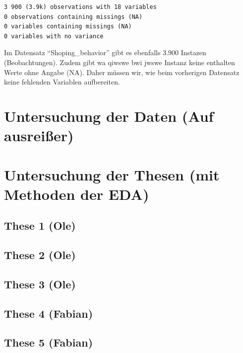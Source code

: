 \documentclass[
  letterpaper,
  DIV=11]{scrartcl}
\begin{document}
\begin{verbatim}
3 900 (3.9k) observations with 18 variables
0 observations containing missings (NA)
0 variables containing missings (NA)
0 variables with no variance
\end{verbatim}

Im Datensatz ``Shoping\_behavior'' gibt es ebenfalls 3.900 Instazen
(Beobachtungen). Zudem gibt wa qiwswe bwi jwswe Instanz keine enthalten
Werte ohne Angabe (NA). Daher müssen wir, wie beim vorherigen Datensatz
keine fehlenden Variablen aufbereiten.

\hypertarget{untersuchung-der-daten-auf-ausreiuxdfer}{%
\section{Untersuchung der Daten (Auf
ausreißer)}\label{untersuchung-der-daten-auf-ausreiuxdfer}}

\hypertarget{untersuchung-der-thesen-mit-methoden-der-eda}{%
\section{Untersuchung der Thesen (mit Methoden der
EDA)}\label{untersuchung-der-thesen-mit-methoden-der-eda}}

\hypertarget{these-1-ole}{%
\subsection{These 1 (Ole)}\label{these-1-ole}}

\hypertarget{these-2-ole}{%
\subsection{These 2 (Ole)}\label{these-2-ole}}

\hypertarget{these-3-ole}{%
\subsection{These 3 (Ole)}\label{these-3-ole}}

\hypertarget{these-4-fabian}{%
\subsection{These 4 (Fabian)}\label{these-4-fabian}}

\hypertarget{these-5-fabian}{%
\subsection{These 5 (Fabian)}\label{these-5-fabian}}
\end{document}
